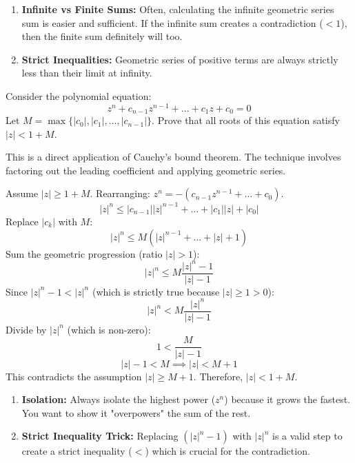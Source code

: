 \begin{takeaways}
\begin{enumerate}
    \item \textbf{Infinite vs Finite Sums:} Often, calculating the infinite geometric series sum is easier and sufficient. If the infinite sum creates a contradiction ($<1$), then the finite sum definitely will too.
    \item \textbf{Strict Inequalities:} Geometric series of positive terms are always strictly less than their limit at infinity.
\end{enumerate}
\end{takeaways}

\begin{problem}
Consider the polynomial equation:
\[ z^n + c_{n-1}z^{n-1} + \dots + c_1 z + c_0 = 0 \]
Let $M = \max \{ |c_0|, |c_1|, \dots, |c_{n-1}| \}$.
Prove that all roots of this equation satisfy $|z| < 1 + M$.
\end{problem}

\begin{hint}
This is a direct application of Cauchy's bound theorem. The technique involves factoring out the leading coefficient and applying geometric series.
\end{hint}

\begin{solution}
Assume $|z| \ge 1+M$.
Rearranging: $z^n = -(c_{n-1}z^{n-1} + \dots + c_0)$.
\[ |z|^n \le |c_{n-1}||z|^{n-1} + \dots + |c_1||z| + |c_0| \]
Replace $|c_k|$ with $M$:
\[ |z|^n \le M (|z|^{n-1} + \dots + |z| + 1) \]
Sum the geometric progression (ratio $|z| > 1$):
\[ |z|^n \le M \frac{|z|^n - 1}{|z| - 1} \]
Since $|z|^n - 1 < |z|^n$ (which is strictly true because $|z| \ge 1 > 0$):
\[ |z|^n < M \frac{|z|^n}{|z| - 1} \]
Divide by $|z|^n$ (which is non-zero):
\[ 1 < \frac{M}{|z| - 1} \]
\[ |z| - 1 < M \implies |z| < M + 1 \]
This contradicts the assumption $|z| \ge M+1$.
Therefore, $|z| < 1+M$.
\end{solution}

\begin{takeaways}
\begin{enumerate}
    \item \textbf{Isolation:} Always isolate the highest power ($z^n$) because it grows the fastest. You want to show it "overpowers" the sum of the rest.
    \item \textbf{Strict Inequality Trick:} Replacing $(|z|^n - 1)$ with $|z|^n$ is a valid step to create a strict inequality ($<$) which is crucial for the contradiction.
\end{enumerate}
\end{takeaways}

